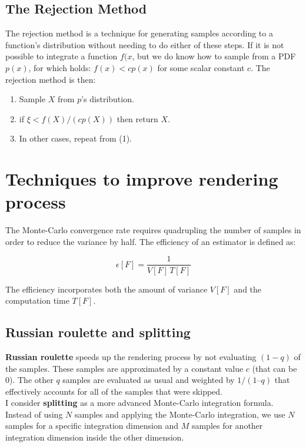 \subsection{The Rejection Method}
The rejection method is a technique for generating samples according to a function's distribution without needing to do either of these steps. If it is not possible to integrate a function $f(x$, but we do know how to sample from a PDF $p(x)$, for which holds: $f(x) < c p(x)$ for some scalar constant $c$. The rejection method is then:

\begin{enumerate}
\item Sample $X$ from $p$'s distribution.
\item if $\xi < f(X) / (c p(X))$ then return $X$.
\item In other cases, repeat from (1).
\end{enumerate}

\section{Techniques to improve rendering process}

The Monte-Carlo convergence rate requires quadrupling the number of samples in order to reduce the variance by half. The efficiency of an estimator is defined as:

\begin{equation}
\epsilon[F] = \frac{1}{V[F]\, T[F]}
\end{equation}

The efficiency incorporates both the amount of variance $V[F]$ and the computation time $T[F]$.

\subsection{Russian roulette and splitting}
\textbf{Russian roulette} speeds up the rendering process by not evaluating $(1-q)$ of the samples. These samples are approximated by a constant value $c$ (that can be $0$). The other $q$ samples are evaluated as usual and weighted by $1/(1 – q)$ that effectively accounts for all of the samples that were skipped.\\

I consider \textbf{splitting} as a more advanced Monte-Carlo integration formula. Instead of using $N$ samples and applying the Monte-Carlo integration, we use $N$ samples for a specific integration dimension and $M$ samples for another integration dimension inside the other dimension.


